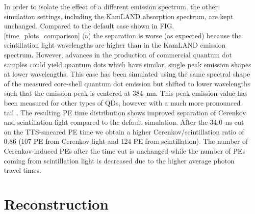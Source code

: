 \documentclass[aps,prc,twocolumn,groupedaddress,showpacs,amsmath,amssymb,floatfix,superscriptaddress]{revtex4}
\begin{document}
In order to isolate the effect of a different emission spectrum, the
other simulation settings, including the KamLAND absorption spectrum,
are kept unchanged. Compared to the default case shown in
FIG. \ref{time_plots_comparison} (a) the separation is worse (as
expected) because the scintillation light wavelengths are higher than
in the KamLAND emission spectrum. However, advances in the production
of commercial quantum dot samples could yield quantum dots which have
similar, single peak emission shapes at lower wavelengths. This case
has been simulated using the same spectral shape of the measured
core-shell quantum dot emission but shifted to lower wavelengths such
that the emission peak is centered at 384~nm. This peak emission value
has been measured for other types of QDs, however with a much more
pronounced tail \cite{qdot2}. The resulting PE time distribution shows
improved separation of Cerenkov and scintillation light compared to
the default simulation. After the 34.0~ns cut on the TTS-smeared PE
time we obtain a higher Cerenkov/scintillation ratio of 0.86 (107 PE
from Cerenkov light and 124 PE from scintillation). The number of
Cerenkov-induced PEs after the time cut is unchanged while the number
of PEs coming from scintillation light is decreased due to the higher
average photon travel times.

\section{Reconstruction}
\label{reconstruction_sec}
\end{document}

